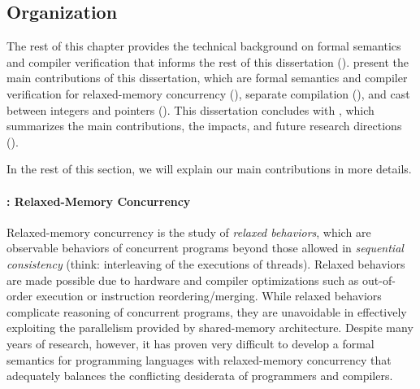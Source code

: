 


\subsection{Organization}

The rest of this chapter provides the technical background on formal semantics and compiler
verification that informs the rest of this dissertation ().
 present the main contributions of this
dissertation, which are formal semantics and compiler verification for relaxed-memory concurrency
(), separate compilation (), and cast between integers and
pointers ().  This dissertation concludes with , which
summarizes the main contributions, the impacts, and future research directions
().

In the rest of this section, we will explain our main contributions in more details.



\paragraph{: Relaxed-Memory Concurrency}

Relaxed-memory concurrency is the study of \emph{relaxed behaviors}, which are observable behaviors
of concurrent programs beyond those allowed in \emph{sequential consistency} (think: interleaving of
the executions of threads).  Relaxed behaviors are made possible due to hardware and compiler
optimizations such as out-of-order execution or instruction reordering/merging.  While relaxed
behaviors complicate reasoning of concurrent programs, they are unavoidable in effectively
exploiting the parallelism provided by shared-memory architecture.  Despite many years of research,
however, it has proven very difficult to develop a formal semantics for programming languages with
relaxed-memory concurrency that adequately balances the conflicting desiderata of programmers and
compilers.

